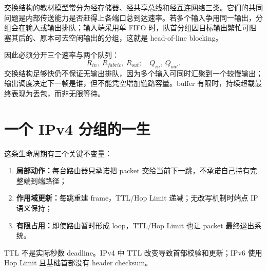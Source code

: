 \documentclass[11pt,a4paper]{ctexart}
\newcommand{\kw}[1]{\textbf{\color{deep}#1}}
\begin{document}
交换结构的教材模型常分为经存储器、经共享总线和经互连网络三类。它们的共同问题是内部传送能力是否赶得上各端口总到达速率。若多个输入争用同一输出，分组会在输入或输出排队；输入端采用单 FIFO 时，队首分组因目标输出繁忙可阻塞其后的、原本可去空闲输出的分组，这就是 head-of-line blocking。

因此必须分开三个速率与两个队列：
\[
\boxed{R_{in},\ R_{fabric},\ R_{out};\quad Q_{in},\ Q_{out}}.
\]
交换结构足够快仍不保证无输出排队，因为多个输入可同时汇聚到一个较慢输出；输出调度决定下一帧是谁，但不能凭空增加链路容量。buffer 有限时，持续超载最终表现为丢包，而非无限等待。

\section{一个 IPv4 分组的一生}

\begin{center}
\end{center}

这条生命周期有三个关键不变量：
\begin{enumerate}
  \item \kw{局部动作：}每台路由器只承诺把 packet 交给当前下一跳，不承诺自己持有完整端到端路径；
  \item \kw{作用域更新：}每跳重建 frame，TTL/Hop Limit 递减；无改写机制时端点 IP 语义保持；
  \item \kw{有限占用：}即使路由暂时形成 loop，TTL/Hop Limit 也让 packet 最终退出系统。
\end{enumerate}

TTL 不是实际秒数 deadline。IPv4 中 TTL 改变导致首部校验和更新；IPv6 使用 Hop Limit 且基础首部没有 header checksum。
\end{document}
